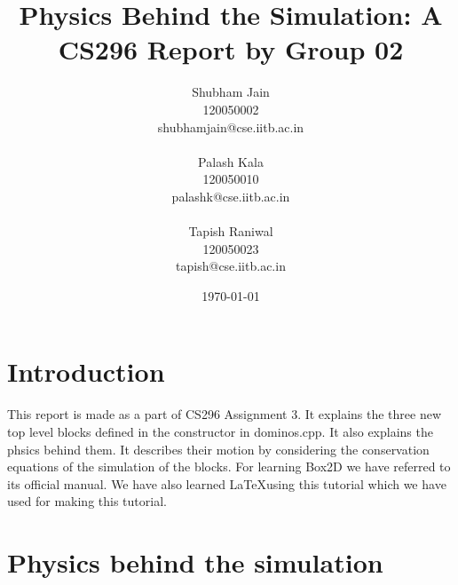 \documentclass[english, 11pt]{article}
\begin{document}
\title{Physics Behind the Simulation: A CS296 Report by Group 02}

\author{Shubham Jain\\ %
	120050002\\
	shubhamjain@cse.iitb.ac.in\\
	\\	
	Palash Kala\\
	120050010\\
	palashk@cse.iitb.ac.in\\
	\\
	Tapish Raniwal\\
	120050023\\
	tapish@cse.iitb.ac.in\\}

\date{\today}

\maketitle %

\section{Introduction}
This report is made as a part of CS296 Assignment 3.
It explains the three new top level blocks defined in the constructor in dominos.cpp. It also explains the phsics behind them.
It describes their motion by considering the conservation equations of the simulation of the blocks.
For learning Box2D we have referred to its official manual\cite{box2dman}.
We have also learned \LaTeX using this tutorial \cite{man1} which we have used for making this tutorial. 

\section{Physics behind the simulation}
\end{document}
